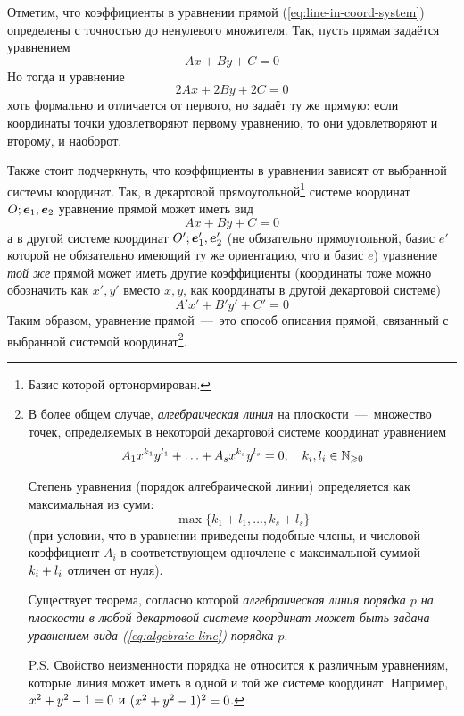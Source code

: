 \documentclass[a4paper,12pt]{article}
\begin{document}
  Отметим, что коэффициенты в уравнении прямой (\ref{eq:line-in-coord-system}) определены с точностью до ненулевого множителя.
  Так, пусть прямая задаётся уравнением
  \[
    Ax + By + C = 0
  \]
  Но тогда и уравнение
  \[
    2Ax + 2By + 2C = 0
  \]
  хоть формально и отличается от первого, но задаёт ту же прямую: если координаты точки удовлетворяют первому уравнению, то они удовлетворяют и второму, и наоборот.
  
  Также стоит подчеркнуть, что коэффициенты в уравнении зависят от выбранной системы координат.
  Так, в декартовой прямоугольной\footnote{Базис которой ортонормирован.} системе координат $O; \boldsymbol e_1, \boldsymbol e_2$
  уравнение прямой может иметь вид 
  \[
    Ax + By + C = 0
  \]
  а в другой системе координат $O'; \boldsymbol e_1', \boldsymbol e_2'$ (не обязательно прямоугольной, базис $e'$ которой не обязательно имеющий ту же ориентацию, что и базис $e$) уравнение \emph{той же} прямой может иметь другие коэффициенты
  (координаты тоже можно обозначить как $x', y'$ вместо $x, y$, как координаты в другой декартовой системе)
  \[
    A'x' + B'y' + C' = 0
  \]
  Таким образом, уравнение прямой~---~это способ описания прямой, связанный с выбранной системой координат\footnote{
    В более общем случае, \emph{алгебраическая линия} на плоскости~---~множество точек, определяемых в некоторой декартовой системе координат уравнением
    \begin{equation}\label{eq:algebraic-line}
      A_1 x^{k_1} y^{l_1} + \ldots + A_s x^{k_s} y^{l_s} = 0, \quad k_i, l_i \in \mathbb N_{\geqslant 0}
    \end{equation}
    
    Степень уравнения (порядок алгебраической линии) определяется как максимальная из сумм:
    \[
      \max{\{k_1 + l_1, \ldots, k_s + l_s\}}
    \]
    (при условии, что в уравнении приведены подобные члены, и числовой коэффициент $A_i$ в соответствующем одночлене с максимальной суммой $k_i \hm+ l_i$ отличен от нуля).

    Существует теорема, согласно которой \emph{алгебраическая линия порядка $p$ на плоскости в \emph{любой} декартовой системе координат может быть задана уравнением вида (\ref{eq:algebraic-line}) порядка $p$}.
    
    P.S. Свойство неизменности порядка не относится к различным уравнениям, которые линия может иметь в одной и той же системе координат. 
    Например, $x^2 \hm+ y^2 \hm- 1 \hm= 0$ и $(x^2 \hm+ y^2 \hm- 1)^2 \hm= 0$.
  }.
  
\end{document}
